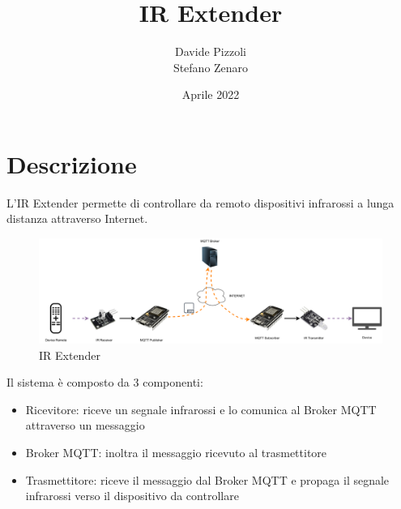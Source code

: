 \documentclass[a4paper,11pt]{article}
\begin{document}
\title{IR Extender}
\author{Davide Pizzoli \\ Stefano Zenaro}
\date{Aprile 2022}


\begin{titlepage}
  \maketitle
  \thispagestyle{empty}
\end{titlepage}

\tableofcontents
{}
\clearpage


\section{Descrizione}

    L'IR Extender permette di controllare da remoto dispositivi infrarossi a lunga distanza attraverso Internet.

    \begin{figure}[H]
      \centering
      \includegraphics[width=\textwidth,height=\textheight,keepaspectratio]{assets/ir_extender}
      \caption{IR Extender}
    \end{figure}

    Il sistema è composto da 3 componenti:
    \begin{itemize}
      \item Ricevitore: riceve un segnale infrarossi e lo comunica al Broker MQTT attraverso un messaggio
      \item Broker MQTT: inoltra il messaggio ricevuto al trasmettitore
      \item Trasmettitore: riceve il messaggio dal Broker MQTT e propaga il segnale infrarossi verso il dispositivo da controllare
    \end{itemize}

\end{document}
